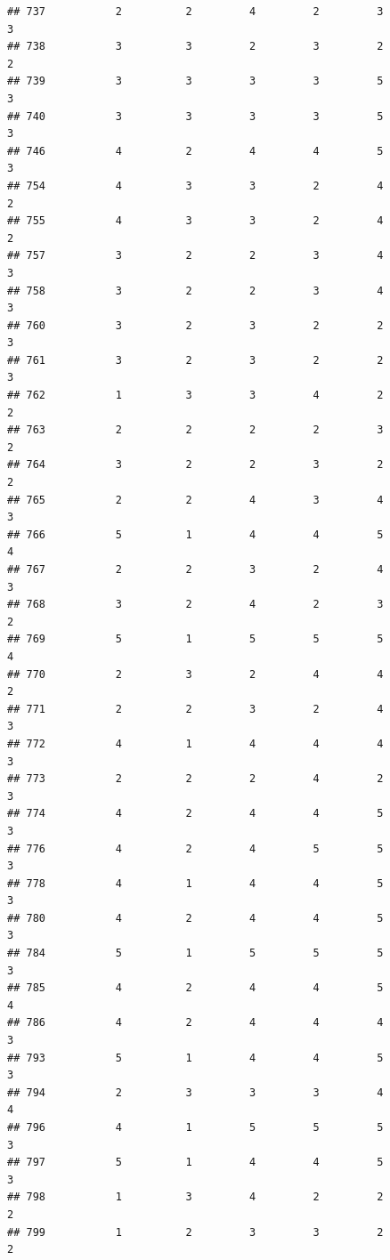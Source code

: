 \documentclass[
]{article}
\begin{document}
\begin{verbatim}
## 737           2          2         4         2         3             3
## 738           3          3         2         3         2             2
## 739           3          3         3         3         5             3
## 740           3          3         3         3         5             3
## 746           4          2         4         4         5             3
## 754           4          3         3         2         4             2
## 755           4          3         3         2         4             2
## 757           3          2         2         3         4             3
## 758           3          2         2         3         4             3
## 760           3          2         3         2         2             3
## 761           3          2         3         2         2             3
## 762           1          3         3         4         2             2
## 763           2          2         2         2         3             2
## 764           3          2         2         3         2             2
## 765           2          2         4         3         4             3
## 766           5          1         4         4         5             4
## 767           2          2         3         2         4             3
## 768           3          2         4         2         3             2
## 769           5          1         5         5         5             4
## 770           2          3         2         4         4             2
## 771           2          2         3         2         4             3
## 772           4          1         4         4         4             3
## 773           2          2         2         4         2             3
## 774           4          2         4         4         5             3
## 776           4          2         4         5         5             3
## 778           4          1         4         4         5             3
## 780           4          2         4         4         5             3
## 784           5          1         5         5         5             3
## 785           4          2         4         4         5             4
## 786           4          2         4         4         4             3
## 793           5          1         4         4         5             3
## 794           2          3         3         3         4             4
## 796           4          1         5         5         5             3
## 797           5          1         4         4         5             3
## 798           1          3         4         2         2             2
## 799           1          2         3         3         2             2

\end{verbatim}
\end{document}
